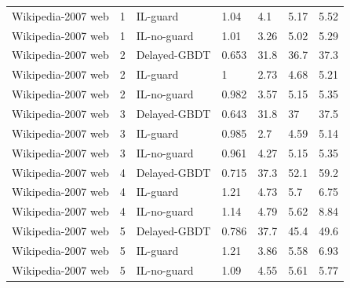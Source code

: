 \begin{table}[t]
\begin{tabular}{lllllll}
Wikipedia-2007 web & 1 & IL-guard & 1.04 & 4.1 & 5.17 & 5.52 \\
Wikipedia-2007 web & 1 & IL-no-guard & 1.01 & 3.26 & 5.02 & 5.29 \\
Wikipedia-2007 web & 2 & Delayed-GBDT & 0.653 & 31.8 & 36.7 & 37.3 \\
Wikipedia-2007 web & 2 & IL-guard & 1 & 2.73 & 4.68 & 5.21 \\
Wikipedia-2007 web & 2 & IL-no-guard & 0.982 & 3.57 & 5.15 & 5.35 \\
Wikipedia-2007 web & 3 & Delayed-GBDT & 0.643 & 31.8 & 37 & 37.5 \\
Wikipedia-2007 web & 3 & IL-guard & 0.985 & 2.7 & 4.59 & 5.14 \\
Wikipedia-2007 web & 3 & IL-no-guard & 0.961 & 4.27 & 5.15 & 5.35 \\
Wikipedia-2007 web & 4 & Delayed-GBDT & 0.715 & 37.3 & 52.1 & 59.2 \\
Wikipedia-2007 web & 4 & IL-guard & 1.21 & 4.73 & 5.7 & 6.75 \\
Wikipedia-2007 web & 4 & IL-no-guard & 1.14 & 4.79 & 5.62 & 8.84 \\
Wikipedia-2007 web & 5 & Delayed-GBDT & 0.786 & 37.7 & 45.4 & 49.6 \\
Wikipedia-2007 web & 5 & IL-guard & 1.21 & 3.86 & 5.58 & 6.93 \\
Wikipedia-2007 web & 5 & IL-no-guard & 1.09 & 4.55 & 5.61 & 5.77 \\
\bottomrule
\end{tabular}
\end{table}

